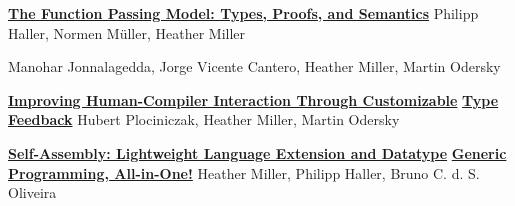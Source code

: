 \documentclass[9pt]{article}
\begin{document}




{}
 \medskip


\noindent\href{https://infoscience.epfl.ch/record/221395}{\bf The Function Passing Model: Types, Proofs, and Semantics}
\newline\noindent Philipp Haller, Normen M\"{u}ller, Heather Miller
\medskip

\newline\noindent Manohar Jonnalagedda, Jorge Vicente Cantero, Heather Miller, Martin Odersky
\medskip

\noindent\href{https://infoscience.epfl.ch/record/197948}{\bf Improving Human-Compiler Interaction Through Customizable} \vspace{-0.03in}
\newline\noindent\href{https://infoscience.epfl.ch/record/197948}{\bf Type Feedback}\dates{}
\newline\noindent Hubert Plociniczak, Heather Miller, Martin Odersky
\medskip

\noindent\href{https://infoscience.epfl.ch/record/199389}{\bf Self-Assembly: Lightweight Language Extension and Datatype}\vspace{-0.03in}
\newline\noindent\href{https://infoscience.epfl.ch/record/199389}{\bf Generic Programming, All-in-One!}\dates{}
\newline\noindent Heather Miller, Philipp Haller, Bruno C. d. S. Oliveira
\medskip
\end{document}
